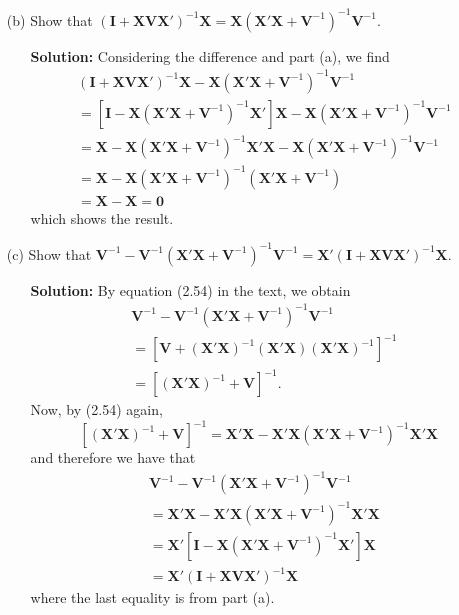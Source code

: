 \documentclass[11pt]{article}
\begin{document}
\begin{itemize}
\newpage
\item[(b)] Show that $(\textbf{I} + \textbf{X}\textbf{V}\textbf{X}')^{-1}\textbf{X} = \textbf{X}(\textbf{X}'\textbf{X} + \textbf{V}^{-1})^{-1}\textbf{V}^{-1}.$
\begin{itemize}
\item[] \textbf{Solution:}  Considering the difference and part (a), we find
\begin{align*}
&(\textbf{I} + \textbf{X}\textbf{V}\textbf{X}')^{-1}\textbf{X} - \textbf{X}(\textbf{X}'\textbf{X} + \textbf{V}^{-1})^{-1}\textbf{V}^{-1} \\
&= \left[\textbf{I} - \textbf{X}(\textbf{X}'\textbf{X} + \textbf{V}^{-1})^{-1}\textbf{X}'\right]\mathbf{X} - \textbf{X}(\textbf{X}'\textbf{X} + \textbf{V}^{-1})^{-1}\textbf{V}^{-1} \\
&= \textbf{X} - \textbf{X}(\textbf{X}'\textbf{X} + \textbf{V}^{-1})^{-1}\textbf{X}'\textbf{X} - \textbf{X}(\textbf{X}'\textbf{X} + \textbf{V}^{-1})^{-1}\textbf{V}^{-1} \\
&= \textbf{X} - \textbf{X}(\textbf{X}'\textbf{X} + \textbf{V}^{-1})^{-1}(\textbf{X}'\textbf{X} + \textbf{V}^{-1}) \\
&= \textbf{X} - \textbf{X} = \textbf{0}
\end{align*}
which shows the result.%
\end{itemize}

\item[(c)] Show that $\textbf{V}^{-1} - \textbf{V}^{-1}(\textbf{X}'\textbf{X} + \textbf{V}^{-1})^{-1}\textbf{V}^{-1} = \textbf{X}'(\textbf{I} + \textbf{X}\textbf{V}\textbf{X}')^{-1}\textbf{X}$.
\begin{itemize}
\item[] \textbf{Solution:}  By equation (2.54) in the text, we obtain
\begin{align*}
&\textbf{V}^{-1} - \textbf{V}^{-1}(\textbf{X}'\textbf{X} + \textbf{V}^{-1})^{-1}\textbf{V}^{-1} \\
&= \left[\textbf{V} + (\textbf{X}'\textbf{X})^{-1}(\textbf{X}'\textbf{X})(\textbf{X}'\textbf{X})^{-1}\right]^{-1} 
\\
&= \left[(\textbf{X}'\textbf{X})^{-1} + \textbf{V}\right]^{-1}.
\end{align*}
Now, by (2.54) again, 
\[
\left[(\textbf{X}'\textbf{X})^{-1} + \textbf{V}\right]^{-1} = \textbf{X}'\textbf{X} - \textbf{X}'\textbf{X}(\textbf{X}'\textbf{X} + \textbf{V}^{-1})^{-1}\textbf{X}'\textbf{X}
\]
and therefore we have that
\begin{align*}
&\textbf{V}^{-1} - \textbf{V}^{-1}(\textbf{X}'\textbf{X} + \textbf{V}^{-1})^{-1}\textbf{V}^{-1} \\
&= \textbf{X}'\textbf{X} - \textbf{X}'\textbf{X}(\textbf{X}'\textbf{X} + \textbf{V}^{-1})^{-1}\textbf{X}'\textbf{X} \\
&= \textbf{X}'\left[\textbf{I} - \textbf{X}(\textbf{X}'\textbf{X} + \textbf{V}^{-1})^{-1}\textbf{X}'\right]\textbf{X} \\
&= \textbf{X}'(\textbf{I} + \textbf{X}\textbf{V}\textbf{X}')^{-1}\textbf{X}
\end{align*}
where the last equality is from part (a).
\end{itemize}
\end{itemize}
\end{document}
